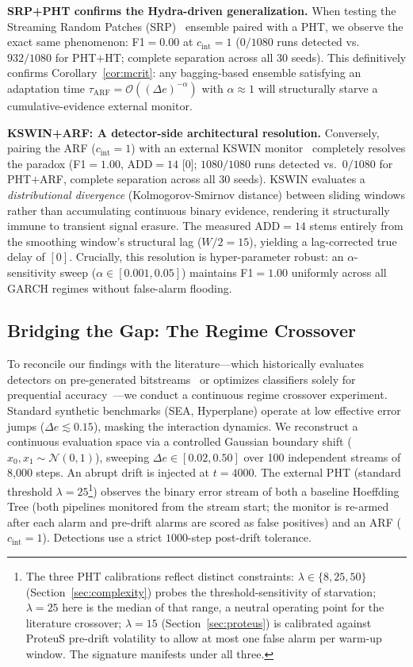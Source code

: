 \documentclass[10pt,conference]{IEEEtran}
\theoremstyle{definition}
\begin{document}
\textbf{SRP+PHT confirms the Hydra-driven generalization.}
When testing the Streaming Random Patches (SRP)~\cite{gomes_srp_2019} ensemble paired with a PHT, we observe the exact same phenomenon: F1${=}0.00$ at $c_{\mathrm{int}}=1$ ($0/1080$ runs detected vs.\ $932/1080$ for PHT$+$HT; complete separation across all 30 seeds). This definitively confirms Corollary~\ref{cor:mcrit}: any bagging-based ensemble satisfying an adaptation time $\tau_{\mathrm{ARF}} = \mathcal{O}((\Delta e)^{-\alpha})$ with $\alpha \approx 1$ will structurally starve a cumulative-evidence external monitor.

\textbf{KSWIN+ARF: A detector-side architectural resolution.}
Conversely, pairing the ARF ($c_{\mathrm{int}}=1$) with an external KSWIN monitor~\cite{raab_kswin_2020} completely resolves the paradox (F1${=}1.00$, ADD${=}14$ [0]; $1080/1080$ runs detected vs.\ $0/1080$ for PHT$+$ARF, complete separation across all 30 seeds). KSWIN evaluates a \emph{distributional divergence} (Kolmogorov-Smirnov distance) between sliding windows rather than accumulating continuous binary evidence, rendering it structurally immune to transient signal erasure. The measured ADD${=}14$ stems entirely from the smoothing window's structural lag ($W/2=15$), yielding a lag-corrected true delay of $[0]$. Crucially, this resolution is hyper-parameter robust: an $\alpha$-sensitivity sweep ($\alpha \in [0.001, 0.05]$) maintains F1${=}1.00$ uniformly across all GARCH regimes without false-alarm flooding.

\subsection{Bridging the Gap: The Regime Crossover}\label{sec:crossover}

To reconcile our findings with the literature---which historically evaluates detectors on pre-generated bitstreams~\cite{goncalves_2014} or optimizes classifiers solely for prequential accuracy~\cite{gomes_arf_2017}---we conduct a continuous regime crossover experiment.
Standard synthetic benchmarks (SEA, Hyperplane) operate at low effective error jumps ($\Delta e \lesssim 0.15$), masking the interaction dynamics. We reconstruct a continuous evaluation space via a controlled Gaussian boundary shift ($x_0, x_1 \sim \mathcal{N}(0,1)$), sweeping $\Delta e \in[0.02, 0.50]$ over 100 independent streams of 8,000 steps. An abrupt drift is injected at $t{=}4000$. The external PHT (standard threshold $\lambda=25$\footnote{The three PHT calibrations reflect distinct constraints: $\lambda \in \{8, 25, 50\}$ (Section~\ref{sec:complexity}) probes the threshold-sensitivity of starvation; $\lambda = 25$ here is the median of that range, a neutral operating point for the literature crossover; $\lambda = 15$ (Section~\ref{sec:proteus}) is calibrated against ProteuS pre-drift volatility to allow at most one false alarm per warm-up window. The signature manifests under all three.}) observes the binary error stream of both a baseline Hoeffding Tree (both pipelines monitored from the stream start; the monitor is re-armed after each alarm and pre-drift alarms are scored as false positives) and an ARF ($c_{\mathrm{int}}=1$). Detections use a strict $1000$-step post-drift tolerance.
\end{document}

